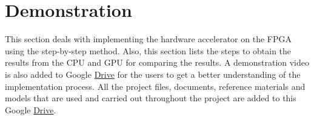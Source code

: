 \documentclass[a4paper,12pt,oneside]{book}
\begin{document}
\section{Demonstration}
This section deals with implementing the hardware accelerator on the FPGA using the step-by-step method. Also, this section lists the steps to obtain the results from the CPU and GPU for comparing the results. A demonstration video is also added to Google \href{https://drive.google.com/file/d/16WsQvynVm7deqsmaAB_vbvT4a0hNm1vk/view?usp=sharing}{Drive} for the users to get a better understanding of the implementation process. All the project files, documents, reference materials and models that are used and carried out throughout the project are added to this Google \href{https://drive.google.com/drive/folders/1BqBZ5q350s5VY3MsdWqtLLzMQtBQPrcu?usp=sharing}{Drive}.
\end{document}
